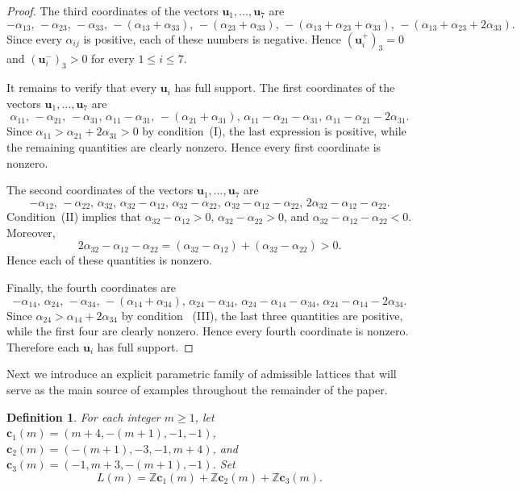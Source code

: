 \documentclass[10pt,a4paper]{amsart}
\newtheorem{definition}[theorem]{Definition}
\begin{document}
\begin{proof}
The third coordinates of the vectors
$\mathbf u_1,\ldots,\mathbf u_7$ are
\[
-\alpha_{13},\,
-\alpha_{23},\,
-\alpha_{33},\,
-(\alpha_{13}+\alpha_{33}),\,
-(\alpha_{23}+\alpha_{33}),\,
-(\alpha_{13}+\alpha_{23}+\alpha_{33}),\,
-(\alpha_{13}+\alpha_{23}+2\alpha_{33}).
\]
Since every $\alpha_{ij}$ is positive, each of these numbers is
negative. Hence
$
(\mathbf u_i^+)_3=0$ and $(\mathbf u_i^-)_3>0$ for every $1\le i\le7$.

It remains to verify that every $\mathbf u_i$ has full support.
The first coordinates of the vectors
$\mathbf u_1,\ldots,\mathbf u_7$ are
\[
\alpha_{11},\,
-\alpha_{21},\,
-\alpha_{31},\,
\alpha_{11}-\alpha_{31},\,
-(\alpha_{21}+\alpha_{31}),\,
\alpha_{11}-\alpha_{21}-\alpha_{31},\,
\alpha_{11}-\alpha_{21}-2\alpha_{31}.
\]
Since
$
\alpha_{11}>\alpha_{21}+2\alpha_{31}>0$
by condition~\textup{(I)}, the last expression is positive, while the
remaining quantities are clearly nonzero. Hence every first coordinate
is nonzero.

The second coordinates of the vectors
$\mathbf u_1,\ldots,\mathbf u_7$ are
\[
-\alpha_{12},\,
-\alpha_{22},\,
\alpha_{32},\,
\alpha_{32}-\alpha_{12},\,
\alpha_{32}-\alpha_{22},\,
\alpha_{32}-\alpha_{12}-\alpha_{22},\,
2\alpha_{32}-\alpha_{12}-\alpha_{22}.
\]
Condition~\textup{(II)} implies that
$\alpha_{32}-\alpha_{12}>0$, $\alpha_{32}-\alpha_{22}>0$, and 
$\alpha_{32}-\alpha_{12}-\alpha_{22}<0.$
Moreover,
\[
2\alpha_{32}-\alpha_{12}-\alpha_{22}
=
(\alpha_{32}-\alpha_{12})
+
(\alpha_{32}-\alpha_{22})
>
0.
\]
Hence each of these quantities is nonzero.

Finally, the fourth coordinates are
\[
-\alpha_{14},\,
\alpha_{24},\,
-\alpha_{34},\,
-(\alpha_{14}+\alpha_{34}),\,
\alpha_{24}-\alpha_{34},\,
\alpha_{24}-\alpha_{14}-\alpha_{34},\,
\alpha_{24}-\alpha_{14}-2\alpha_{34}.
\]
Since $ \alpha_{24}>\alpha_{14}+2\alpha_{34}$ by condition ~\textup{(III)}, the last three quantities are positive, while the first four are clearly nonzero. Hence every fourth coordinate is nonzero. Therefore each $\mathbf u_i$
has full support.
\end{proof}

Next we introduce an explicit parametric family of admissible lattices that will serve as the main source of examples throughout the remainder of the paper.

\begin{definition}\label{def:family}
For each integer $m\ge1$, let $\mathbf c_1(m)=(m+4,-(m+1),-1,-1)$,
$\mathbf c_2(m)=(-(m+1),-3,-1,m+4)$, and
$\mathbf c_3(m)=(-1,m+3,-(m+1),-1)$. Set
\[
L(m)=
\mathbb Z\mathbf c_1(m)+
\mathbb Z\mathbf c_2(m)+
\mathbb Z\mathbf c_3(m).
\]
\end{definition}
\end{document}
